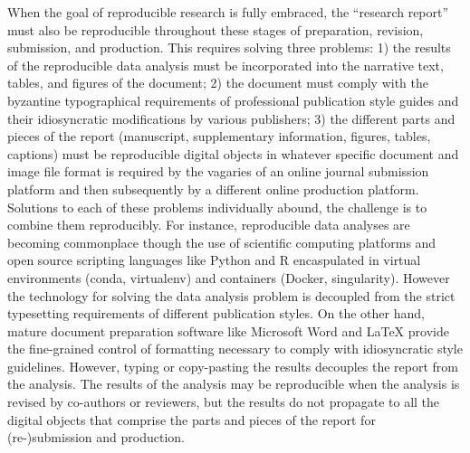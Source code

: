 \documentclass[helv,10pt,man,floatsintext]{apa6}  %
\begin{document}
When the goal of reproducible research is fully embraced, the
``research report'' must also be reproducible throughout these stages
of preparation, revision, submission, and production. This requires
solving three problems: 1) the results of the reproducible data
analysis must be incorporated into the narrative text, tables, and
figures of the document; 2) the document must comply with the
byzantine typographical requirements of professional publication style
guides and their idiosyncratic modifications by various publishers; 3)
the different parts and pieces of the report (manuscript,
supplementary information, figures, tables, captions) must be
reproducible digital objects in whatever specific document and image
file format is required by the vagaries of an online journal
submission platform and then subsequently by a different online
production platform. Solutions to each of these problems individually
abound, the challenge is to combine them reproducibly. For instance,
reproducible data analyses are becoming commonplace though the use of
scientific computing platforms and open source scripting languages
like Python and R encaspulated in virtual environments (conda,
virtualenv) and containers (Docker, singularity). However the
technology for solving the data analysis problem is decoupled from the
strict typesetting requirements of different publication styles. On
the other hand, mature document preparation software like Microsoft
Word and \LaTeX{} provide the fine-grained control of formatting
necessary to comply with idiosyncratic style guidelines. However,
typing or copy-pasting the results decouples the report from the
analysis.  The results of the analysis may be reproducible when the
analysis is revised by co-authors or reviewers, but the results do not
propagate to all the digital objects that comprise the parts and
pieces of the report for (re-)submission and production.
\end{document}
